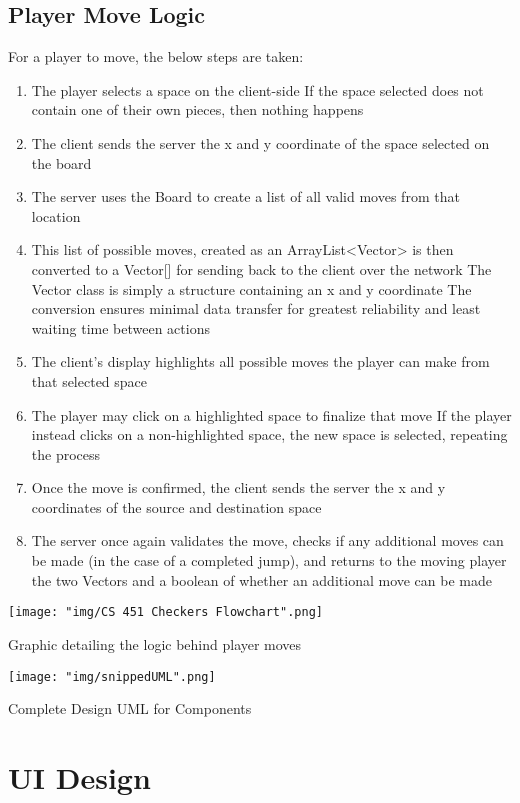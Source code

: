 \documentclass{scrreprt}
\begin{document}
	\section{Player Move Logic}
		For a player to move, the below steps are taken:
		\begin{enumerate} [label*=\arabic*.]
		\item The player selects a space on the client-side
			\subitem If the space selected does not contain one of their own pieces, then nothing happens
		\item The client sends the server the x and y coordinate of the space selected on the board
		\item The server uses the Board to create a list of all valid moves from that location
		\item This list of possible moves, created as an ArrayList<Vector> is then converted to a Vector[] for sending back to the client over the network
			\subitem The Vector class is simply a structure containing an x and y coordinate
			\subitem The conversion ensures minimal data transfer for greatest reliability and least waiting time between actions
		\item The client's display highlights all possible moves the player can make from that selected space
		\item The player may click on a highlighted space to finalize that move
			\subitem If the player instead clicks on a non-highlighted space, the new space is selected, repeating the process
		\item Once the move is confirmed, the client sends the server the x and y coordinates of the source and destination space
		\item The server once again validates the move, checks if any additional moves can be made (in the case of a completed jump), and returns to the moving player the two Vectors and a boolean of whether an additional move can be made
		\end{enumerate}
	
		\texttt{[image: "img/CS 451 Checkers Flowchart".png]}	

		Graphic detailing the logic behind player moves

		\texttt{[image: "img/snippedUML".png]}

		Complete Design UML for Components

\chapter{UI Design}
\end{document}
